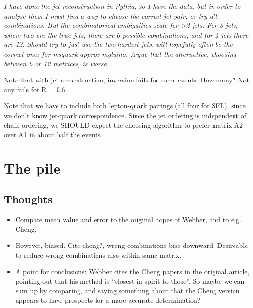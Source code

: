 \documentclass[twoside,english]{uiofysmaster}
\begin{document}
{\it I have done the jet-reconstruction in Pythia, so I have the data, but in order to analyse them I must find a way to choose the correct jet-pair, or try all combinations. But the combinatorical ambiguities scale for >2 jets. For 3 jets, where two are the true jets, there are 6 possible combinations, and for 4 jets there are 12. Should try to just use the two hardest jets, will hopefully often be the correct ones for msquark approx mgluino. Argue that the alternative, choosing between 6 or 12 matrices, is worse.}

Note that with jet reconstruction, inversion fails for some events. How many? Not any fails for R = 0.6.

Note that we have to include both lepton-quark pairings (all four for SFL), since we don't know jet-quark correspondence. Since the jet ordering is independent of chain ordering, we SHOULD expect the choosing algorithm to prefer matrix A2 over A1 in about half the events. 






\clearpage
\section{The pile}

\subsection{Thoughts}

\begin{itemize}
\item Compare mean value and error to the original hopes of Webber, and to e.g. Cheng. 
\item However, biased. Cite cheng?, wrong combinations bias downward. Desireable to reduce wrong combinations also within same matrix.
\item A point for conclusions: Webber cites the Cheng papers in the original article, pointing out that his method is ``closest in spirit to those''. So maybe we can sum up by comparing, and saying something about that the Cheng version appears to have prospects for a more accurate determination?
\end{itemize}
\end{document}
